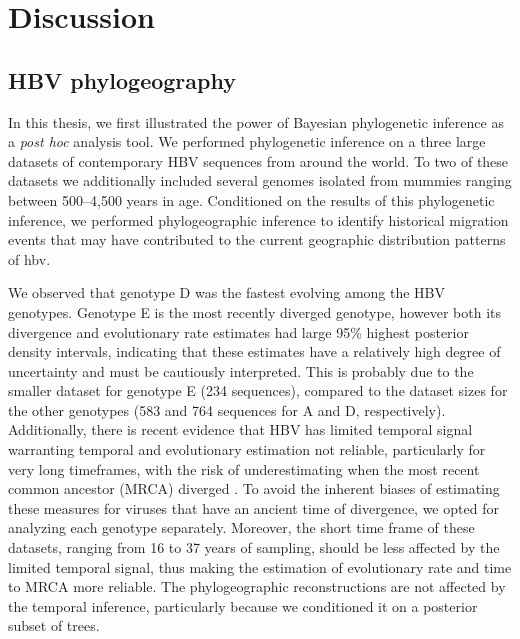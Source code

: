 \chapter{Discussion}
\label{ch:discussion}

\section{HBV phylogeography}

In this thesis, we first illustrated the power of Bayesian phylogenetic inference as a \textit{post hoc} analysis tool.
We performed phylogenetic inference on a three large datasets of contemporary HBV sequences from around the world.
To two of these datasets we additionally included several genomes isolated from mummies ranging between 500--4,500 years in age.
Conditioned on the results of this phylogenetic inference, we performed phylogeographic inference to identify historical migration events that may have contributed to the current geographic distribution patterns of \gls{hbv}.

We observed that genotype D was the fastest evolving among the HBV genotypes.
Genotype E is the most recently diverged genotype, however both its divergence and evolutionary rate estimates had large 95\% highest posterior density intervals, indicating that these estimates have a relatively high degree of uncertainty and must be cautiously interpreted.
This is probably due to the smaller dataset for genotype E (234 sequences), compared to the dataset sizes for the other genotypes (583 and 764 sequences for A and D, respectively).
Additionally, there is recent evidence that HBV has limited temporal signal warranting temporal and evolutionary estimation not reliable, particularly for very long timeframes, with the risk of underestimating when the most recent common ancestor (MRCA) diverged \cite{ross2018paradox}.
To avoid the inherent biases of estimating these measures for viruses that have an ancient time of divergence, we opted for analyzing each genotype separately.
Moreover, the short time frame of these datasets, ranging from 16 to 37 years of sampling, should be less affected by the limited temporal signal, thus making the estimation of evolutionary rate and time to MRCA more reliable. %
The phylogeographic reconstructions are not affected by the temporal inference, particularly because we conditioned it on a posterior subset of trees.


